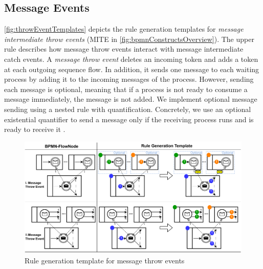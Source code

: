 \documentclass[submission, copyright, creativecommons]{eptcs}
\begin{document}
\subsection{Message Events}
\autoref{fig:throwEventTemplates} depicts the rule generation templates for \textit{message intermediate throw events} (\textsf{MITE} in \autoref{fig:bpmnConstructsOverview}).
The upper rule describes how message throw events interact with message intermediate catch events.
A \textit{message throw event} deletes an incoming token and adds a token at each outgoing sequence flow.
In addition, it sends one message to each waiting process by adding it to the incoming messages of the process.
However, sending each message is optional, meaning that if a process is not ready to consume a message immediately, the message is not added.
We implement optional message sending using a nested rule with quantification.
Concretely, we use an optional existential quantifier to send a message only if the receiving process runs and is ready to receive it \cite{rensinkNestedQuantificationGraph2006}.

\begin{figure}[h]
    \centering
    \includegraphics[width=1\textwidth]{images/throw_messages.pdf}
    \caption{Rule generation template for message throw events}
    \label{fig:throwEventTemplates}
\end{figure}
\end{document}
